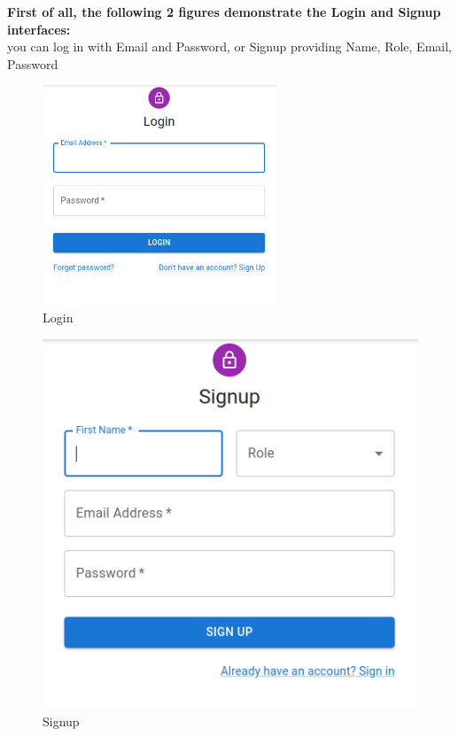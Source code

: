 
        
        \noindent \textbf{First of all, the following 2 figures demonstrate the Login and Signup interfaces:} \\
        you can log in with Email and Password, or Signup providing Name, Role, Email, Password
        \begin{figure}[H]
        \begin{center}
        \includegraphics[width=7cm]{./diagnosis-system/presentation-of-app/login.png}
        \end{center}
        \caption{Login}
        \label{fig:}
        \end{figure}

        

        \begin{figure}[H]
        \begin{center}
        \includegraphics[width=12cm]{./diagnosis-system/presentation-of-app/signup.png}
        \end{center}
        \caption{Signup}
        \label{fig:}
        \end{figure}

